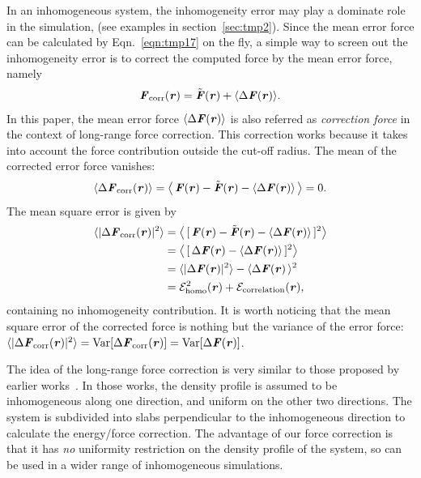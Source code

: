 \documentclass[preprint]{revtex4}
\renewcommand{\v}[1]{\textbf{\textit{#1}}}
\begin{document}
In an inhomogeneous system, the inhomogeneity error may play a
dominate role in the simulation, (see examples in section~\ref{sec:tmp2}).
Since the mean error force can be calculated
by Eqn.~\eqref{eqn:tmp17} on the fly, a simple way to screen out the
inhomogeneity error is to correct the computed force by the mean error
force, namely
\begin{align}\label{eqn:define-fcorr}
  \v F_{\textrm{corr}}(\v r) = \tilde{\v F}(\v r) + \langle\Delta\v F(\v r)\rangle.
\end{align}
In this paper, the mean error force $\langle\Delta\v F(\v r)\rangle$
is also referred as \emph{correction force} in the context of
long-range force correction. This correction works because it takes
into account the force contribution outside the cut-off radius. The mean of
the corrected error force vanishes:
\begin{align}\label{eqn:mean-fcorr}
  \langle\Delta\v F_{\textrm{corr}}(\v r)\rangle
   =
  \big\langle\,
  \v F(\v r) - \tilde{\v F}(\v r) - \langle\Delta\v F(\v r)\rangle\,
  \big\rangle = 0.
\end{align}
The mean square error is given by
\begin{align} \nonumber
  \langle\vert\Delta\v F_{\textrm{corr}}(\v r)\vert^2\rangle
  & =
  \big\langle\,
  [\,\v F(\v r) - \tilde{\v F}(\v r) - \langle\Delta\v F(\v r)\rangle\,]^2
  \big\rangle \\\nonumber
  & =
  \big\langle\,
  [\,\Delta\v F(\v r) - \langle\Delta\v F(\v r)\rangle\,]^2
  \big\rangle \\\nonumber
  & =
  \langle\vert\Delta\v F(\v r)\vert^2\rangle -
  \langle\Delta\v F(\v r)\,\rangle^2 \\
  & =
  \mathcal E^2_{\textrm{homo}}(\v r) +
  \mathcal E_{\textrm{correlation}}(\v r),
\end{align}
containing no inhomogeneity contribution.  It is worth noticing that the mean
square error of the corrected force is nothing but the variance of the
error force: $\langle\vert\Delta\v
F_{\textrm{corr}}(\v r)\vert^2\rangle = \textrm{Var}[\Delta\v
F_{\textrm{corr}}(\v r)] = \textrm{Var}[\Delta\v F(\v r)]$.

The idea of the long-range force correction is very similar to those
proposed by earlier works~\cite{guo1997long, mecke1997molecular,
  janecek2006long, shen2007comparative}. In those works, the density
profile is assumed to be inhomogeneous along one direction, and uniform
on the other two directions.
The
system is subdivided into slabs perpendicular to the inhomogeneous direction to
calculate the energy/force correction. The advantage of our force
correction is that it has \emph{no} uniformity restriction on the density
profile of the system, so can be used in a wider range of
inhomogeneous simulations.
\end{document}
